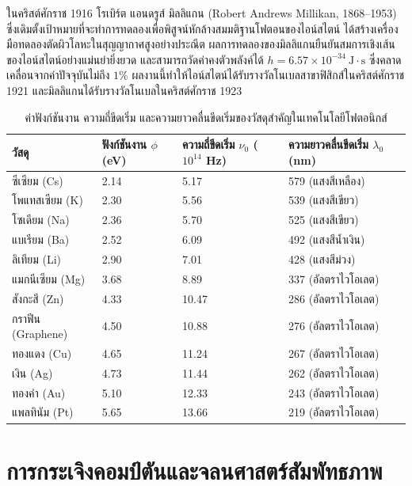 ในคริสต์ศักราช 1916 โรเบิร์ต แอนดรูส์ มิลลิแกน (Robert Andrews Millikan, 1868--1953) ซึ่งเดิมตั้งเป้าหมายที่จะทำการทดลองเพื่อพิสูจน์หักล้างสมมติฐานโฟตอนของไอน์สไตน์ ได้สร้างเครื่องมือทดลองตัดผิวโลหะในสุญญากาศสูงอย่างประณีต ผลการทดลองของมิลลิแกนยืนยันสมการเชิงเส้นของไอน์สไตน์อย่างแม่นยำยิ่งยวด และสามารถวัดค่าคงตัวพลังค์ได้ $h = 6.57 \times 10^{-34}~\text{J}\cdot\text{s}$ ซึ่งคลาดเคลื่อนจากค่าปัจจุบันไม่ถึง $1\%$ ผลงานนี้ทำให้ไอน์สไตน์ได้รับรางวัลโนเบลสาขาฟิสิกส์ในคริสต์ศักราช 1921 และมิลลิแกนได้รับรางวัลโนเบลในคริสต์ศักราช 1923

\begin{table}[H]
\centering
\caption{ค่าฟังก์ชันงาน ความถี่ขีดเริ่ม และความยาวคลื่นขีดเริ่มของวัสดุสำคัญในเทคโนโลยีโฟตอนิกส์}
\label{tab:comprehensive_work_functions}
\begin{tabularx}{0.95\textwidth}{ZZZZ}
\toprule
\textbf{วัสดุ} & \textbf{ฟังก์ชันงาน $\phi$ (eV)} & \textbf{ความถี่ขีดเริ่ม $\nu_0$ ($10^{14}$ Hz)} & \textbf{ความยาวคลื่นขีดเริ่ม $\lambda_0$ (nm)} \\
\midrule
ซีเซียม (Cs) & 2.14 & 5.17 & 579 (แสงสีเหลือง) \\
โพแทสเซียม (K) & 2.30 & 5.56 & 539 (แสงสีเขียว) \\
โซเดียม (Na) & 2.36 & 5.70 & 525 (แสงสีเขียว) \\
แบเรียม (Ba) & 2.52 & 6.09 & 492 (แสงสีน้ำเงิน) \\
ลิเทียม (Li) & 2.90 & 7.01 & 428 (แสงสีม่วง) \\
แมกนีเซียม (Mg) & 3.68 & 8.89 & 337 (อัลตราไวโอเลต) \\
สังกะสี (Zn) & 4.33 & 10.47 & 286 (อัลตราไวโอเลต) \\
กราฟีน (Graphene) & 4.50 & 10.88 & 276 (อัลตราไวโอเลต) \\
ทองแดง (Cu) & 4.65 & 11.24 & 267 (อัลตราไวโอเลต) \\
เงิน (Ag) & 4.73 & 11.44 & 262 (อัลตราไวโอเลต) \\
ทองคำ (Au) & 5.10 & 12.33 & 243 (อัลตราไวโอเลต) \\
แพลทินัม (Pt) & 5.65 & 13.66 & 219 (อัลตราไวโอเลต) \\
\bottomrule
\end{tabularx}
\end{table}

\section{การกระเจิงคอมป์ตันและจลนศาสตร์สัมพัทธภาพ}

